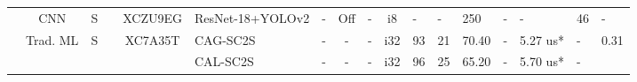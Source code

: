\begin{table}
\begin{adjustbox}{totalheight=\baselineskip,}
\begin{tabular}{ccccclp{2em}cp{3em}cp{2em}p{4em}p{3em}p{3.5em}p{3.5em}p{2.5em}p{3em}}
   &\multirow{1}{*}{CNN}
       &\multirow{1}{*}{S}
           &\multirow{1}{*}{\cite{gargAircraftDetectionSatellite2024}}
               &\multirow{1}{*}{XCZU9EG}
                   &\multirow{1}{*}{ResNet-18+YOLOv2}
                       &\multirow{1}{*}{-}
                           &\multirow{1}{*}{Off}
                               &\multirow{1}{*}{-}
                                   &\multirow{1}{*}{i8}
                                       &\multirow{1}{*}{-}
                                           &\multirow{1}{*}{-}
                                               &\multirow{1}{*}{250}
                                                   &\multirow{1}{*}{-}
                                                       &\multirow{1}{*}{-}
                                                           &\multirow{1}{*}{46}
                                                               &\multirow{1}{*}{-}\\
\cmidrule{2-17}
   &\multirow{3}{*}{Trad. ML}
       &\multirow{3}{*}{S}
           &\multirow{3}{*}{\cite{gyaneshwarRealtimeSCSUP2022}}
               &\multirow{3}{*}{XC7A35T}
                   &\multirow{1}{*}{CAG-SC2S}
                       &\multirow{1}{*}{-}
                           &\multirow{1}{*}{-}
                               &\multirow{1}{*}{-}
                                   &\multirow{1}{*}{i32}
                                       &\multirow{1}{*}{93}
                                           &\multirow{1}{*}{21}
                                               &\multirow{1}{*}{70.40}
                                                   &\multirow{1}{*}{-}
                                                       &\multirow{1}{*}{5.27 us*}
                                                           &\multirow{1}{*}{-}
                                                               &\multirow{1}{*}{0.31}\\
   &   &   &   &   &\multirow{1}{*}{CAL-SC2S}
                       &\multirow{1}{*}{-}
                           &\multirow{1}{*}{-}
                               &\multirow{1}{*}{-}
                                   &\multirow{1}{*}{i32}
                                       &\multirow{1}{*}{96}
                                           &\multirow{1}{*}{25}
                                               &\multirow{1}{*}{65.20}
                                                   &\multirow{1}{*}{-}
                                                       &\multirow{1}{*}{5.70 us*}
                                                           &\multirow{1}{*}{-}

\end{tabular}
\end{adjustbox}
\end{table}

